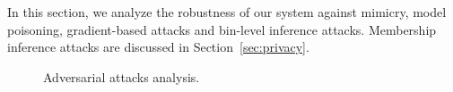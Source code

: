 

In this section, we analyze the robustness of our system against mimicry, model poisoning, gradient-based attacks and bin-level inference attacks. Membership inference attacks are discussed in Section~\ref{sec:privacy}.

\begin{figure}[!t]
  \centering
  \hfill
  \hfill
  \hfill
  \caption{Adversarial attacks analysis.}
  \label{fig:poison}
  \vspace{-3ex}
\end{figure}

